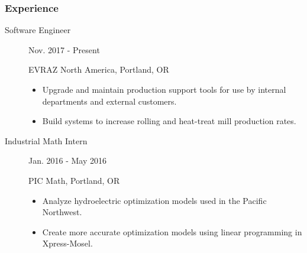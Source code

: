 \documentclass{article}
\begin{document}

\subsubsection*{Experience}

    \begin{description}
		
		\item[Software Engineer] \hfill Nov. 2017 - Present
		
		EVRAZ North America, Portland, OR
		\begin{itemize}
			\item Upgrade and maintain production support tools for use by internal departments and external customers.
			\item Build systems to increase rolling and heat-treat mill production rates.
		\end{itemize}
		
		\vspace{0.5em}
		
        \item[Industrial Math Intern] \hfill Jan. 2016 - May 2016
        
        PIC Math, Portland, OR
        \begin{itemize}
            \item Analyze hydroelectric optimization models used in the Pacific Northwest.
            \item Create more accurate optimization models using linear programming in Xpress-Mosel.
        \end{itemize}

        
    \end{description}
\end{document}
